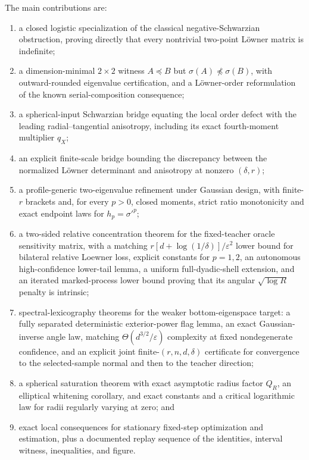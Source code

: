 \documentclass[11pt]{article}
\begin{document}
The main contributions are:
\begin{enumerate}[leftmargin=2em]
 \item a closed logistic specialization of the classical negative-Schwarzian obstruction, proving directly that
 every nontrivial two-point L\"owner matrix is indefinite;
 \item a dimension-minimal $2\times2$ witness $A\preceq B$ but $\sigma(A)\npreceq\sigma(B)$, with
 outward-rounded eigenvalue certification, and a L\"owner-order reformulation of the known serial-composition
 consequence;
 \item a spherical-input Schwarzian bridge equating the local order defect with the leading
 radial--tangential anisotropy, including its exact fourth-moment multiplier $q_X$;
 \item an explicit finite-scale bridge bounding the discrepancy between the normalized L\"owner determinant
 and anisotropy at nonzero $(\delta,r)$;
 \item a profile-generic two-eigenvalue refinement under Gaussian design, with finite-$r$ brackets and, for
 every $p>0$, closed moments, strict ratio monotonicity and exact endpoint laws for $h_p=\sigma'^p$;
 \item a two-sided relative concentration theorem for the fixed-teacher oracle sensitivity matrix, with a matching
 $r[d+\log(1/\delta)]/\varepsilon^2$ lower bound for bilateral relative Loewner loss, explicit constants for
 $p=1,2$, an autonomous high-confidence lower-tail lemma, a uniform full-dyadic-shell extension, and an
 iterated marked-process lower bound proving that its angular $\sqrt{\log R}$ penalty is intrinsic;
 \item spectral-lexicography theorems for the weaker bottom-eigenspace target: a fully separated deterministic
 exterior-power flag lemma, an exact Gaussian-inverse angle law, matching $\Theta(d^{3/2}/\varepsilon)$
 complexity at fixed nondegenerate confidence, and an explicit joint finite-$(r,n,d,\delta)$ certificate
 for convergence to the selected-sample normal and then to the teacher direction;
 \item a spherical saturation theorem with exact asymptotic radius factor $Q_R$, an elliptical whitening
 corollary, and exact constants and a critical logarithmic law for radii regularly varying at zero; and
 \item exact local consequences for stationary fixed-step optimization and estimation, plus a documented replay sequence
 of the identities,
 interval witness, inequalities, and figure.
\end{enumerate}
\end{document}
